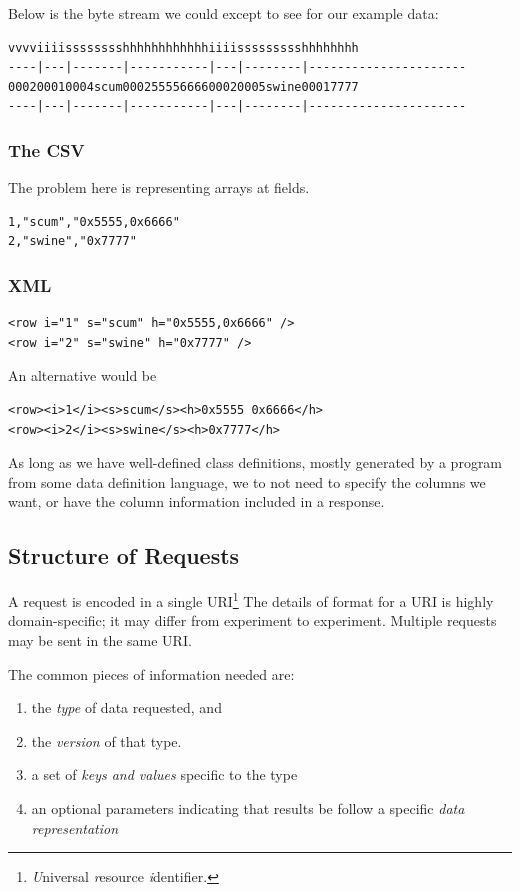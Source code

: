 Below is the byte stream we could except to see for our example data:

\begin{verbatim}
vvvviiiisssssssshhhhhhhhhhhhiiiissssssssshhhhhhhh
----|---|-------|-----------|---|--------|----------------------
000200010004scum00025555666600020005swine00017777
----|---|-------|-----------|---|--------|----------------------
\end{verbatim}

\subsubsection{The CSV}
The problem here is representing arrays at fields. 
\begin{verbatim}
1,"scum","0x5555,0x6666"
2,"swine","0x7777"
\end{verbatim}

\subsubsection{XML}
\begin{verbatim}
<row i="1" s="scum" h="0x5555,0x6666" />
<row i="2" s="swine" h="0x7777" />
\end{verbatim}

An alternative would be
\begin{verbatim}
<row><i>1</i><s>scum</s><h>0x5555 0x6666</h>
<row><i>2</i><s>swine</s><h>0x7777</h>
\end{verbatim}

As long as we have well-defined class definitions, mostly generated by
a program from some data definition language, we to not need to specify
the columns we want, or have the column information included in a 
response.

\subsection{Structure of Requests}

A request is encoded in a single URI\footnote{\textit{U}niversal
\textit{r}esource \textit{i}dentifier.} The details of format for a URI
is highly domain-specific; it may differ from experiment to experiment.
Multiple requests may be sent in the same URI.

The common pieces of information needed are:

\begin{enumerate}
\item the \emph{type} of data requested, and
\item the \emph{version} of that type.
\item a set of \emph{keys and values} specific to the type
\item an optional parameters indicating that results be
follow a specific \emph{data representation}
\end{enumerate}

